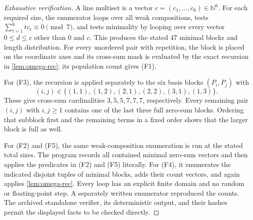 \documentclass[10pt,a4paper]{amsart}
\begin{document}
\begin{proof}[Exhaustive verification]
A line multiset is a vector $c=(c_1,\ldots,c_6)\in\mathbb N^6$.
For each required size, the enumerator loops over all weak
compositions, tests $\sum_{t=1}^6tc_t\equiv0\pmod7$, and tests
minimality by looping over every vector $0\leq d\leq c$ other than
$0$ and $c$.  This produces the stated $47$ minimal blocks and length
distribution.  For every unordered pair with repetition, the block is
placed on the coordinate axes and its cross-sum mask is evaluated by
the exact recursion in \cref{lem:omega-rec}; its population count gives
(F1).

For (F3), the recursion is applied separately to the six basis blocks
$(P_i,P_j)$ with
\[
(i,j)\in\{(1,1),(1,2),(2,1),(2,2),(3,1),(1,3)\}.
\]
These give cross-sum cardinalities $3,5,5,7,7,7$, respectively.
Every remaining pair $(i,j)$ with $i,j\geq1$ contains one of the last
three full zero-sum blocks.  Ordering that subblock first and the
remaining terms in a fixed order shows that the larger block is full
as well.

For (F2) and (F5), the same weak-composition enumeration is run at the
stated total sizes.  The program records all contained minimal
zero-sum vectors and then applies the predicates in (F2) and (F5)
literally.  For (F4), it enumerates the indicated disjoint tuples of
minimal blocks, adds their count vectors, and again applies
\cref{lem:omega-rec}.  Every loop has an explicit finite domain and no
random or floating-point step.  A separately written enumerator
reproduced the counts.  The archived standalone verifier, its deterministic
output, and their hashes permit the displayed facts to be checked directly.
\end{proof}
\end{document}
